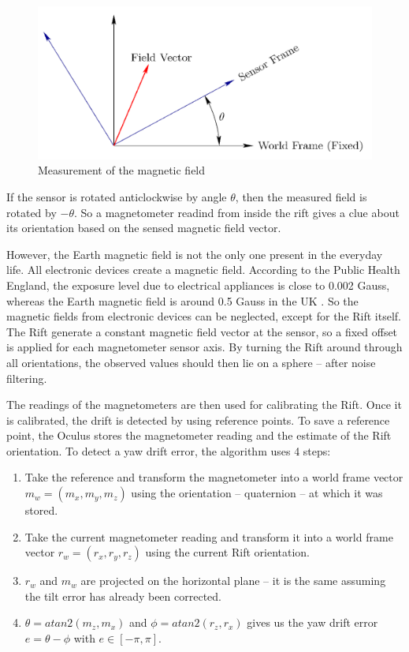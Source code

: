 \documentclass[12pt, twoside]{article}
\begin{document}
\begin{figure}[h]
  \centering
  \includegraphics[scale=0.2]{RotMag.png}
  \caption{\label{fig:field} Measurement of the magnetic field\protect\footnotemark}
\end{figure}

If the sensor is rotated anticlockwise by angle $\theta$, then the measured field is rotated by $-\theta$. So a magnetometer readind from inside the rift gives a clue about its orientation based on the sensed magnetic field vector.

However, the Earth magnetic field is not the only one present in the everyday life. All electronic devices create a magnetic field. According to the Public Health England, the exposure level due to electrical appliances is close to 0.002 Gauss, whereas the Earth magnetic field is around 0.5 Gauss in the UK \cite{HPA}. So the magnetic fields from electronic devices can be neglected, except for the Rift itself. The Rift generate a constant magnetic field vector at the sensor, so a fixed offset is applied for each magnetometer sensor axis. By turning the Rift around through all orientations, the observed values should then lie on a sphere -- after noise filtering.

The readings of the magnetometers are then used for calibrating the Rift. Once it is calibrated, the drift is detected by using reference points. To save a reference point, the Oculus stores the magnetometer reading and the estimate of the Rift orientation. To detect a yaw drift error, the algorithm uses 4 steps:
\begin{enumerate}
\item Take the reference and transform the magnetometer into a world frame vector $m_w=(m_x,m_y,m_z)$ using the orientation -- quaternion -- at which it was stored.
\item Take the current magnetometer reading and transform it into a world frame vector $r_w=(r_x,r_y,r_z)$ using the current Rift orientation.
\item $r_w$ and $m_w$ are projected on the horizontal plane -- it is the same assuming the tilt error has already been corrected.
\item $\theta = atan2(m_z,m_x)$ and $\phi = atan2(r_z,r_x)$ gives us the yaw drift error $e = \theta - \phi$ with $e \in [-\pi,\pi]$.
\end{enumerate}
\end{document}
